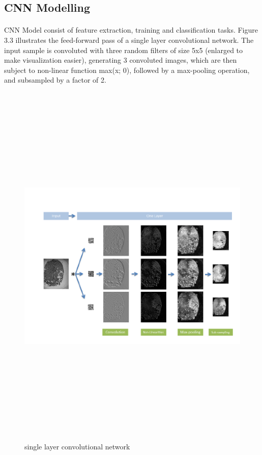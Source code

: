 \documentclass[a4paper,12pt,oneside]{article}
\begin{document}
\subsection{CNN Modelling}

\paragraph{}
CNN Model consist of feature extraction, training and classification tasks.
Figure 3.3 illustrates the feed-forward pass of a single layer
convolutional network. The input sample is convoluted with
three random filters of size 5x5 (enlarged to make visualization
easier), generating 3 convoluted images, which are then subject
to non-linear function max(x; 0), followed by a max-pooling
operation, and subsampled by a factor of 2.


\begin{figure}[H]
\centering
\includegraphics[height=18cm,width=15cm]{cnnfig.PNG}
\caption{single layer convolutional network} 
\end{figure}
\end{document}
